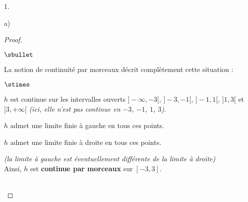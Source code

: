 \documentclass[11pt]{article}%
\begin{document}
\begin{noliste}{1.}
\begin{noliste}{a)}
\begin{proof}
\begin{remark}
\begin{noliste}{$\sbullet$}
        \item La notion de continuité par morceaux décrit complètement
          cette situation :
          \begin{noliste}{$\stimes$}
          \item $h$ est continue sur les intervalles ouverts
            $]-\infty, -3[$, $]-3, -1[$, $]-1, 1[$, $]1, 3[$ et $]3,
            +\infty[$ {\it(ici, elle n'est pas continue en $-3$, $-1$,
              $1$, $3$)}.
          \item $h$ admet une limite finie à gauche en tous ces
            points.
          \item $h$ admet une limite finie à droite en tous ces
            points.
          \end{noliste}
          {\it (la limite à gauche est éventuellement différente de la
            limite à droite)}\\
          Ainsi, $h$ est {\bf continue par morceaux} sur $[-3,3]$.
        \end{noliste}
      \end{remark}~\\[-1.2cm]

\end{proof}
\end{noliste}
\end{noliste}
\end{document}
